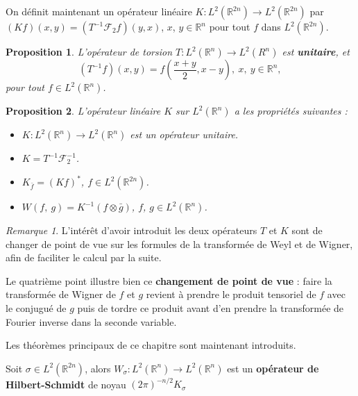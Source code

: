 \documentclass[a4paper, 12pt]{report}
\newcommand{\R}{\mathbb{R}} %
\newcommand{\ra}[1][]{\overset{#1}{\rightarrow}} %
\renewcommand{\.}{\cdot} %
\theoremstyle{break}
\newtheorem{proposition}{Proposition}
\theoremstyle{remark}
\newtheorem{remark}{Remarque}
\theoremstyle{proofstyle}
\begin{document}
On définit maintenant un opérateur linéaire $K : L^2(\R^{2n}) \ra L^2(\R^{2n})$ par
$(Kf)(x,y) = (T^{-1} \mathcal{F}_2f)(y,x)$, $x$, $y \in \R^n$ pour tout $f$ dans $L^2(\R^{2n})$.

\begin{proposition}
    L'opérateur de torsion $T : L^2(\R^n) \ra L^2(R^n)$  est \textbf{unitaire}, et
    $$(T^{-1} f)(x,y) = f\left(\frac{x+y}{2},x-y\right),~ x,~ y \in \R^n,$$
    pour tout $f \in L^2(\R^n)$.
\end{proposition}
\begin{proposition}
    L'opérateur linéaire $K$ sur $L^2(\R^n)$ a les propriétés suivantes :
    \begin{itemize}
        \item $K : L^2(\R^n) \ra L^2(\R^n)$ est un opérateur unitaire.
        \item $K = T^{-1} \mathcal{F}_2^{-1}$.
        \item $K_{\bar{f}} = (Kf)^*$, $f \in L^2(\R^{2n})$.
        \item $W(f,~g) = K^{-1}(f \otimes \bar{g})$, $f$, $g \in L^2(\R^n)$.
    \end{itemize}
\end{proposition}

\begin{remark}
    L'intérêt d'avoir introduit les deux opérateurs $T$ et $K$ sont de changer de point de vue sur les formules de la transformée de Weyl et de Wigner, afin de faciliter le calcul par la suite. \vspace{5pt}

    Le quatrième point illustre bien ce \textbf{changement de point de vue} : faire la transformée de Wigner de $f$ et $g$ revient à prendre le produit tensoriel de $f$ avec le conjugué de $g$ puis de tordre ce produit avant d'en prendre la transformée de Fourier inverse dans la seconde variable.
\end{remark}

Les théorèmes principaux de ce chapitre sont maintenant introduits.

\begin{theorem}
    Soit $\sigma \in L^2(\R^{2n})$, alors $W_\sigma : L^2(\R^n) \ra L^2(\R^n)$ est un \textbf{opérateur de Hilbert-Schmidt} de noyau $(2 \pi)^{-n/2}K_\sigma$
\end{theorem}
\end{document}

